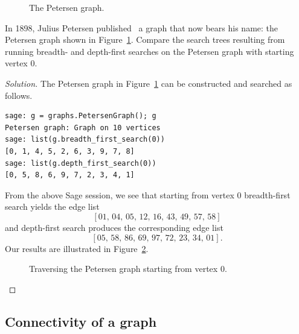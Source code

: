 \begin{figure}[!htbp]
\centering
{}

\caption{The Petersen graph.}
\label{fig:graph_algorithms:Petersen_graph}
\end{figure}

\begin{example}
In 1898, Julius Petersen
published~\cite{Petersen1898} a graph that now bears his name: the
Petersen graph shown in
Figure~\ref{fig:graph_algorithms:Petersen_graph}. Compare the search
trees resulting from running breadth- and
depth-first searches on the Petersen
graph with starting vertex $0$.
\end{example}

\begin{proof}[Solution]
The Petersen graph in
Figure~\ref{fig:graph_algorithms:Petersen_graph}
can be constructed and searched as follows.
\begin{lstlisting}
sage: g = graphs.PetersenGraph(); g
Petersen graph: Graph on 10 vertices
sage: list(g.breadth_first_search(0))
[0, 1, 4, 5, 2, 6, 3, 9, 7, 8]
sage: list(g.depth_first_search(0))
[0, 5, 8, 6, 9, 7, 2, 3, 4, 1]
\end{lstlisting}
From the above Sage session, we see that starting from vertex $0$
breadth-first search yields the edge list
\[
[01,\, 04,\, 05,\, 12,\, 16,\, 43,\, 49,\, 57,\, 58]
\]
and depth-first search produces the
corresponding edge list
\[
[05,\, 58,\, 86,\, 69,\, 97,\, 72,\, 23,\, 34,\, 01].
\]
Our results are illustrated in
Figure~\ref{fig:graph_algorithms:search_Petersen_graph}.
\begin{figure}[!htbp]
\centering
{}

\caption{Traversing the Petersen graph starting from vertex $0$.}
\label{fig:graph_algorithms:search_Petersen_graph}
\end{figure}
\end{proof}



\subsection{Connectivity of a graph}

